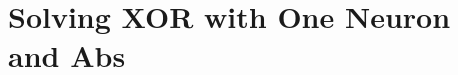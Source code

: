 
\chapter{Solving XOR with One Neuron and Abs}










\printbibliography[heading=subbibliography]


